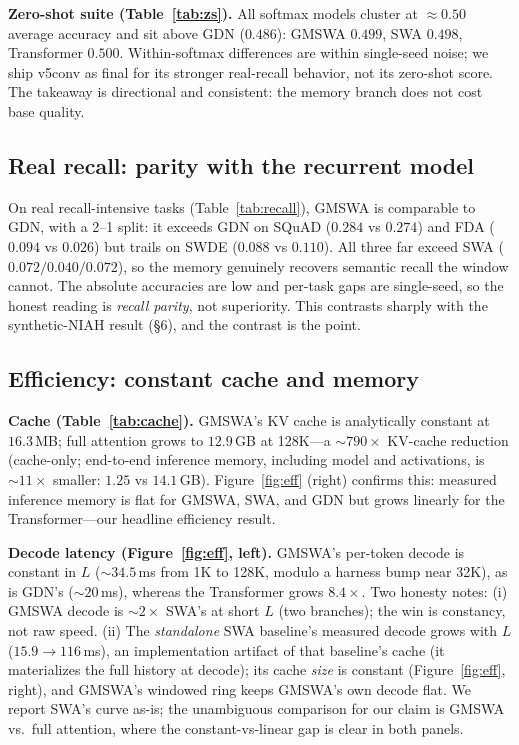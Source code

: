 \documentclass[letterpaper]{article} %
\begin{document}
\textbf{Zero-shot suite (Table~\ref{tab:zs}).} All softmax models cluster at ${\approx}0.50$ average accuracy and sit above GDN ($0.486$): GMSWA $0.499$, SWA $0.498$, Transformer $0.500$. Within-softmax differences are within single-seed noise; we ship v5conv as final for its stronger real-recall behavior, not its zero-shot score. The takeaway is directional and consistent: the memory branch does not cost base quality.

\subsection{Real recall: parity with the recurrent model}
On real recall-intensive tasks (Table~\ref{tab:recall}), GMSWA is comparable to GDN, with a 2--1 split: it exceeds GDN on SQuAD ($0.284$ vs $0.274$) and FDA ($0.094$ vs $0.026$) but trails on SWDE ($0.088$ vs $0.110$). All three far exceed SWA ($0.072/0.040/0.072$), so the memory genuinely recovers semantic recall the window cannot. The absolute accuracies are low and per-task gaps are single-seed, so the honest reading is \emph{recall parity}, not superiority. This contrasts sharply with the synthetic-NIAH result (\S6), and the contrast is the point.

\subsection{Efficiency: constant cache and memory}
\textbf{Cache (Table~\ref{tab:cache}).} GMSWA's KV cache is analytically constant at $16.3$\,MB; full attention grows to $12.9$\,GB at 128K---a ${\sim}790\times$ KV-cache reduction (cache-only; end-to-end inference memory, including model and activations, is ${\sim}11\times$ smaller: $1.25$ vs $14.1$\,GB). Figure~\ref{fig:eff} (right) confirms this: measured inference memory is flat for GMSWA, SWA, and GDN but grows linearly for the Transformer---our headline efficiency result.

\textbf{Decode latency (Figure~\ref{fig:eff}, left).} GMSWA's per-token decode is constant in $L$ (${\sim}34.5$\,ms from 1K to 128K, modulo a harness bump near 32K), as is GDN's (${\sim}20$\,ms), whereas the Transformer grows $8.4\times$. Two honesty notes: (i) GMSWA decode is ${\sim}2\times$ SWA's at short $L$ (two branches); the win is constancy, not raw speed. (ii) The \emph{standalone} SWA baseline's measured decode grows with $L$ ($15.9{\to}116$\,ms), an implementation artifact of that baseline's cache (it materializes the full history at decode); its cache \emph{size} is constant (Figure~\ref{fig:eff}, right), and GMSWA's windowed ring keeps GMSWA's own decode flat. We report SWA's curve as-is; the unambiguous comparison for our claim is GMSWA vs.\ full attention, where the constant-vs-linear gap is clear in both panels.
\end{document}
